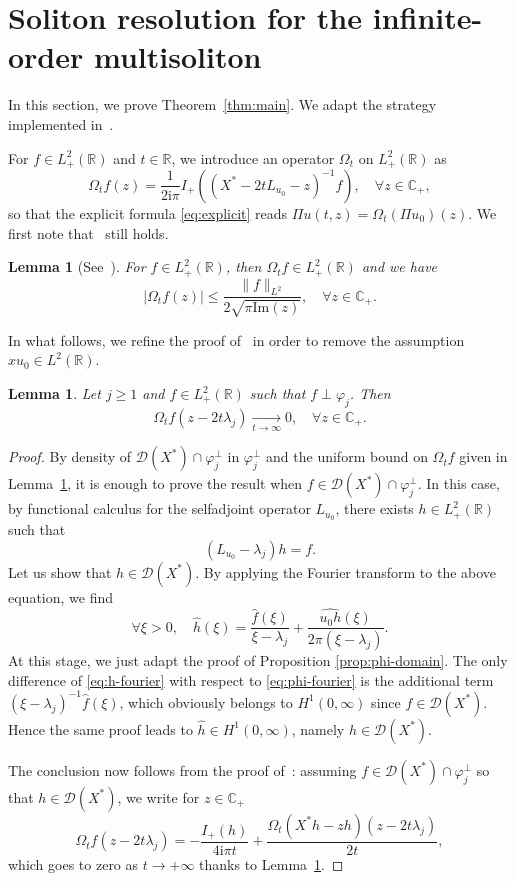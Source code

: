 \documentclass[english, 12pt]{amsart}%
\newcommand{\R}{\mathbb{R}}
\newcommand{\C}{\mathbb{C}}
\newcommand{\ii}{\mathrm{i}}
\renewcommand{\Im}{\mathrm{Im}}
\newcommand{\longrightarroww}[2] {\mathop{\longrightarrow}\limits_{#1}^{#2}}
\newtheorem{lemma}[definition]{Lemma}
\numberwithin{equation}{section}
\begin{document}
\section{Soliton resolution for the infinite-order multisoliton}\label{sec:resol-sol}

In this section, we prove Theorem~\ref{thm:main}.  We adapt the strategy implemented in~\cite{GassotGM26}.

For $f\in L^2_+(\R)$ and $t\in\R$, we introduce an operator $\Omega_t$ on $L^2_+(\R)$  as 
\[
\Omega_tf(z)=\frac{1}{2\ii\pi}I_+((X^*-2tL_{u_0}-z)^{-1}f),
\quad \forall z\in\C_+,
\]
so that the explicit formula \eqref{eq:explicit} reads $\Pi u(t,z)=\Omega_t(\Pi u_0)(z)$.
We first note that~\cite[Lemma 4.1]{GassotGM26} still holds.
\begin{lemma}[See~\cite{GassotGM26}]\label{lem:Omega-t}
For $f\in L^2_+(\R)$, then $\Omega_t f\in L^2_+(\R)$ and we have
\[
|\Omega_tf(z)|
	\leq \frac{\|f\|_{L^2}}{2\sqrt{\pi \Im(z)}},
	\quad \forall z\in\C_+.
\]
\end{lemma}

In what follows, we  refine the proof of~\cite[Lemma 4.2]{GassotGM26} in order to remove the assumption $xu_0\in L^2(\R)$.

\begin{lemma}\label{lem:perp}
Let $j\geq 1$ and $f\in L^2_+(\R)$ such that $f\perp \varphi_j$. Then
\[
\Omega_tf(z-2t\lambda_j)\longrightarroww{t\to\infty}{} 0,
\quad
\forall z\in\C_+.
\]
\end{lemma}

\begin{proof}
By density of $\mathcal{D}(X^*)\cap\varphi_j^\perp$ in $\varphi_j^\perp$ and the uniform bound on $\Omega_t f$ given in Lemma~\ref{lem:Omega-t}, it is enough to prove the result when $f\in\mathcal{D}(X^*)\cap \varphi_j^\perp$. In this case, by functional calculus for the selfadjoint operator $L_{u_0}$, there exists $h\in L^2_+(\R)$ such that
\[
(L_{u_0}-\lambda_j)h=f.
\]
Let us show that $h\in\mathcal{D}(X^*)$. By applying the Fourier transform to the above equation, we find
\begin{equation}\label{eq:h-fourier} 
\forall \xi>0,\quad 
\widehat{h}(\xi)=\frac{\widehat{f}(\xi)}{\xi-\lambda_j}+\frac{\widehat{u_0h}(\xi)}{2\pi(\xi-\lambda_j)}.
\end{equation}
At this stage, we just adapt the proof of Proposition \ref{prop:phi-domain}. The only difference of \eqref{eq:h-fourier} with respect to \eqref{eq:phi-fourier} is the additional term $(\xi -\lambda_j)^{-1}\widehat f(\xi )$, which obviously belongs to $H^1(0,\infty )$ since $f\in \mathcal {D}(X^*)$. Hence the same proof leads to $\widehat h\in H^1(0,\infty )$, namely $h\in \mathcal{D}(X^*).$

The conclusion now follows from the proof of~\cite[Lemma 4.2]{GassotGM26}: assuming $f\in\mathcal{D}(X^*)\cap\varphi_j^\perp$ so that $h\in\mathcal{D}(X^*)$, we write for $z\in\C_+$
\[
\Omega_tf(z-2t\lambda_j)
	=-\frac{I_+(h)}{4\ii\pi t}+\frac{\Omega_t(X^*h-zh)(z-2t\lambda_j)}{2t},
\]
which goes to zero as $t\to+\infty$ thanks to Lemma~\ref{lem:Omega-t}.
\end{proof}
\end{document}
